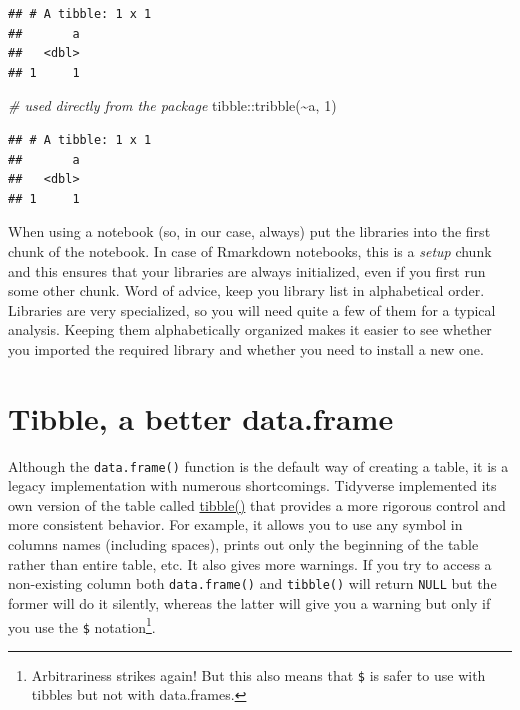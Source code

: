 \documentclass[
]{book}
\newenvironment{Shaded}{\begin{snugshade}}{\end{snugshade}}
\newcommand{\CommentTok}[1]{\textcolor[rgb]{0.56,0.35,0.01}{\textit{#1}}}
\newcommand{\DecValTok}[1]{\textcolor[rgb]{0.00,0.00,0.81}{#1}}
\newcommand{\FunctionTok}[1]{\textcolor[rgb]{0.00,0.00,0.00}{#1}}
\newcommand{\NormalTok}[1]{#1}
\newcommand{\SpecialCharTok}[1]{\textcolor[rgb]{0.00,0.00,0.00}{#1}}
\begin{document}
\begin{verbatim}
## # A tibble: 1 x 1
##       a
##   <dbl>
## 1     1
\end{verbatim}

\begin{Shaded}
\begin{Highlighting}[]
\CommentTok{\# used directly from the package}
\NormalTok{tibble}\SpecialCharTok{::}\FunctionTok{tribble}\NormalTok{(}\SpecialCharTok{\textasciitilde{}}\NormalTok{a, }\DecValTok{1}\NormalTok{)}
\end{Highlighting}
\end{Shaded}

\begin{verbatim}
## # A tibble: 1 x 1
##       a
##   <dbl>
## 1     1
\end{verbatim}

When using a notebook (so, in our case, always) put the libraries into the first chunk of the notebook. In case of Rmarkdown notebooks, this is a \emph{setup} chunk and this ensures that your libraries are always initialized, even if you first run some other chunk. Word of advice, keep you library list in alphabetical order. Libraries are very specialized, so you will need quite a few of them for a typical analysis. Keeping them alphabetically organized makes it easier to see whether you imported the required library and whether you need to install a new one.

\hypertarget{tibble}{%
\section{Tibble, a better data.frame}\label{tibble}}

Although the \texttt{data.frame()} function is the default way of creating a table, it is a legacy implementation with numerous shortcomings. Tidyverse implemented its own version of the table called \href{https://tibble.tidyverse.org/}{tibble()} that provides a more rigorous control and more consistent behavior. For example, it allows you to use any symbol in columns names (including spaces), prints out only the beginning of the table rather than entire table, etc. It also gives more warnings. If you try to access a non-existing column both \texttt{data.frame()} and \texttt{tibble()} will return \texttt{NULL} but the former will do it silently, whereas the latter will give you a warning but only if you use the \texttt{\$} notation\footnote{Arbitrariness strikes again! But this also means that \texttt{\$} is safer to use with tibbles but not with data.frames.}.
\end{document}
